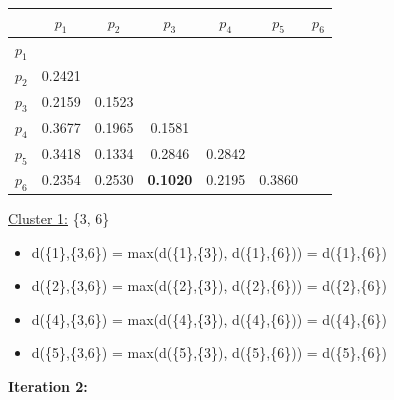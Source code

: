 \documentclass[11pt]{article}
\begin{document}
	\begin{center}
    	\begin{adjustbox}{max width=\textwidth}
		\begin{tabular}{ | c | c | c | c | c | c | c |}
	  	 	\hline

	  	 	& \textbf{$p_1$} & \textbf{$p_2$} & \textbf{$p_3$} & \textbf{$p_4$} & \textbf{$p_5$} & \textbf{$p_6$}\\
	  	 	\hline
	  	 	
	  	 	\textbf{$p_1$} &  &  &  &  &  &\\
	  	 	\hline
	  	 	
	  	 	\textbf{$p_2$} & 0.2421 &  &  &  &  &  \\
	  	 	\hline
	  	 	
	  	 	\textbf{$p_3$} & 0.2159 & 0.1523 &  &  &  & \\
	  	 	\hline
	  	 	
	  	 	\textbf{$p_4$} & 0.3677 & 0.1965 & 0.1581 &  &  & \\
	  	 	\hline
	  	 	
	  	 	\textbf{$p_5$} & 0.3418 & 0.1334 & 0.2846 & 0.2842 &  & \\
	  	 	\hline	
	  	 	
	  	 	\textbf{$p_6$} & 0.2354 & 0.2530 & \textbf{0.1020} & 0.2195 & 0.3860 & \\
	  	 	\hline			
    		\end{tabular}
    	\end{adjustbox}
	\end{center}
	
	\underline{Cluster 1:} \{3, 6\}
	
	\begin{itemize}
		\item d(\{1\},\{3,6\}) = max(d(\{1\},\{3\}), d(\{1\},\{6\})) = d(\{1\},\{6\})
		\item d(\{2\},\{3,6\}) = max(d(\{2\},\{3\}), d(\{2\},\{6\})) = d(\{2\},\{6\})
		\item d(\{4\},\{3,6\}) = max(d(\{4\},\{3\}), d(\{4\},\{6\})) = d(\{4\},\{6\})
		\item d(\{5\},\{3,6\}) = max(d(\{5\},\{3\}), d(\{5\},\{6\})) = d(\{5\},\{6\})
	\end{itemize}
	
	\vspace{5mm}
	
	\textbf{Iteration 2:}
	
\end{document}
